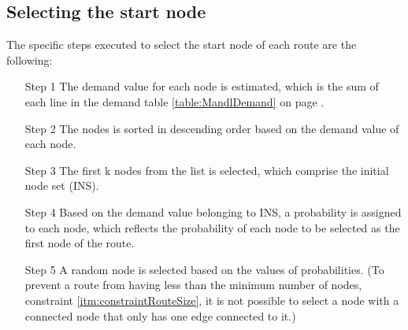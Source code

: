 \subsection{Selecting the start node}
The specific steps executed to select the start node of each route are the following:
\begin{itemize}
\item[Step 1] The demand value for each node is estimated, which is the sum of each line in the demand table \ref{table:MandlDemand} on page \pageref{table:MandlDemand}. 
\item[Step 2] The nodes is sorted in descending order based on the demand value of each node.
\item[Step 3] The first k nodes from the list is selected, which comprise the initial node set (INS). 
\item[Step 4] Based on the demand value belonging to INS, a probability is assigned to each node, which reflects the probability of each node to be selected as the first node of the route. 
\item[Step 5] A random node is selected based on the values of probabilities. (To prevent a route from having less than the minimum number of nodes, constraint \ref{itm:constraintRouteSize}, it is not possible to select a node with a connected node that only has one edge connected to it.)
\end{itemize}

